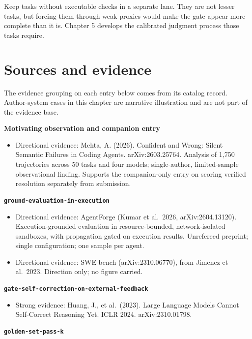 Keep tasks without executable checks in a separate lane. They are not lesser tasks, but forcing them through weak proxies would make the gate appear more complete than it is. Chapter 5 develops the calibrated judgment process those tasks require.

\section*{Sources and evidence}

The evidence grouping on each entry below comes from its catalog record. Author-system cases in this chapter are narrative illustration and are not part of the evidence base.

\textbf{Motivating observation and companion entry}

\begin{itemize}
\tightlist
\item
  Directional evidence: Mehta, A. (2026). Confident and Wrong: Silent Semantic Failures in Coding Agents. arXiv:2603.25764. Analysis of 1,750 trajectories across 50 tasks and four models; single-author, limited-sample observational finding. Supports the companion-only entry on scoring verified resolution separately from submission.
\end{itemize}

\textbf{\texttt{ground-evaluation-in-execution}}

\begin{itemize}
\tightlist
\item
  Directional evidence: AgentForge (Kumar et al.~2026, arXiv:2604.13120). Execution-grounded evaluation in resource-bounded, network-isolated sandboxes, with propagation gated on execution results. Unrefereed preprint; single configuration; one sample per agent.
\item
  Directional evidence: SWE-bench (arXiv:2310.06770), from Jimenez et al.~2023. Direction only; no figure carried.
\end{itemize}

\textbf{\texttt{gate-self-correction-on-external-feedback}}

\begin{itemize}
\tightlist
\item
  Strong evidence: Huang, J., et al.~(2023). Large Language Models Cannot Self-Correct Reasoning Yet. ICLR 2024. arXiv:2310.01798.
\end{itemize}

\textbf{\texttt{golden-set-pass-k}}

